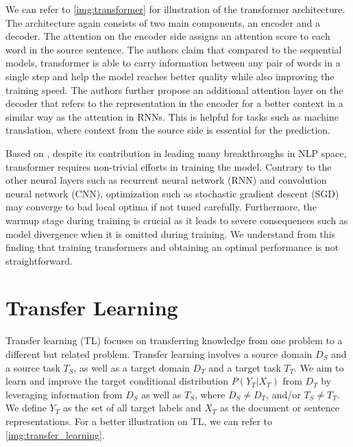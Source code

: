 We can refer to \cref{img:transformer} for illustration of the transformer architecture. The architecture again consists of two main components, an encoder and a decoder. The attention on the encoder side assigns an attention score to each word in the source sentence. The authors claim that compared to the sequential models, transformer is able to carry information between any pair of words in a single step and help the model reaches better quality while also improving the training speed. The authors further propose an additional attention layer on the decoder that refers to the representation in the encoder for a better context in a similar way as the attention in RNNs. This is helpful for tasks such as machine translation, where context from the source side is essential for the prediction.

Based on , despite its contribution in leading many breakthroughs in NLP space, transformer requires non-trivial efforts in training the model. Contrary to the other neural layers such as recurrent neural network (RNN) and convolution neural network (CNN), optimization such as stochastic gradient descent (SGD) may converge to bad local optima if not tuned carefully. Furthermore, the warmup stage during training is crucial as it leads to severe consequences such as model divergence when it is omitted during training. We understand from this finding that training transformers and obtaining an optimal performance is not straightforward.

\section{Transfer Learning}
\label{sec:bm_tl}
Transfer learning (TL) focuses on transferring knowledge from one problem to a different but related problem. Transfer learning involves a source domain $D_S$ and a source task $T_S$, as well as a target domain $D_T$ and a target task $T_T$. We aim to learn and improve the target conditional distribution $P(Y_T|X_T)$ from $D_T$ by leveraging information from $D_S$ as well as $T_S$, where $D_S \neq D_T$, and/or $T_S \neq T_T$. We define $Y_T$ as the set of all target labels and $X_T$ as the document or sentence representations. For a better illustration on TL, we can refer to \cref{img:transfer_learning}.

